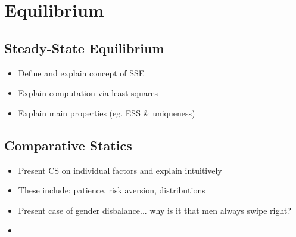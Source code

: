 \section{Equilibrium}
\subsection{Steady-State Equilibrium}
\begin{itemize}
    \item Define and explain concept of SSE
    \item Explain computation via least-squares
    \item Explain main properties (eg. ESS \& uniqueness)
\end{itemize} 
\subsection{Comparative Statics} 
\begin{itemize}
    \item Present CS on individual factors and explain intuitively
    \item These include: patience, risk aversion, distributions  
    \item Present case of gender disbalance... why is it that men always swipe right?
    \item 
\end{itemize} 